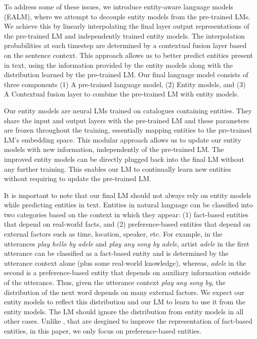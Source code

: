 \documentclass{article}
\begin{document}
To address some of these issues, we introduce entity-aware language models (EALM), where we attempt to decouple entity models from the pre-trained LMs. We achieve this by linearly interpolating the final layer output representations of the pre-trained LM and independently trained entity models. The interpolation probabilities at each timestep are determined by a contextual fusion layer based on the sentence context. This approach allows us to better predict entities present in text, using the information provided by the entity models along with the distribution learned by the pre-trained LM. Our final language model consists of three components (1) A pre-trained language model, (2) Entity models, and (3) A Contextual fusion layer to combine the pre-trained LM with entity models.

Our entity models are neural LMs trained on catalogues containing entities. They share the input and output layers with the pre-trained LM and these parameters are frozen throughout the training, essentially mapping entities to the pre-trained LM's embedding space. This modular approach allows us to update our entity models with new information, independently of the pre-trained LM. The improved entity models can be directly plugged back into the final LM without any further training. This enables our LM to continually learn new entities without requiring to update the pre-trained LM.

It is important to note that our final LM should not always rely on entity models while predicting entities in text. Entities in natural language can be classified into two categories based on the context in which they appear: (1) fact-based entities that depend on real-world facts, and (2) preference-based entities that depend on external factors such as time, location, speaker, etc. For example, in the utterances \emph{play hello by adele} and \emph{play any song by adele}, artist \emph{adele} in the first utterance can be classified as a fact-based entity and is determined by the utterance context alone (plus some real-world knowledge), whereas, \emph{adele} in the second is a preference-based entity that depends on auxiliary information outside of the utterance. Thus, given the utterance context \emph{play any song by}, the distribution of the next word depends on many external factors. We expect our entity models to reflect this distribution and our LM to learn to use it from the entity models. The LM should ignore the distribution from entity models in all other cases. Unlike \citep{Khandelwal, peters-etal-2019-knowledge, zhang-etal-2019-ernie}, that are desgined to improve the representation of fact-based entities, in this paper, we only focus on preference-based entities.
\end{document}
